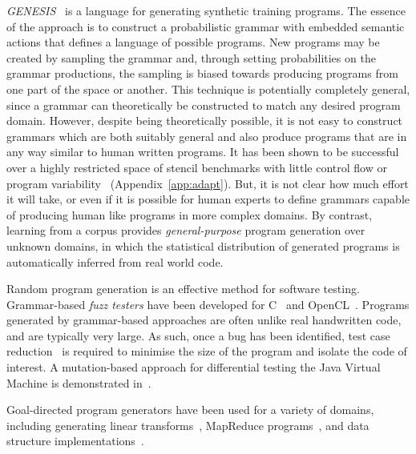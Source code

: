\emph{GENESIS}~\cite{Chiu2015} is a language for generating synthetic training programs. The essence of the approach is to construct a probabilistic grammar with embedded semantic actions that defines a language of possible programs. New programs may be created by sampling the grammar and, through setting probabilities on the grammar productions, the sampling is biased towards producing programs from one part of the space or another. This technique is potentially completely general, since a grammar can theoretically be constructed to match any desired program domain. However, despite being theoretically possible, it is not easy to construct grammars which are both suitably general and also produce programs that are in any way similar to human written programs. It has been shown to be successful over a highly restricted space of stencil benchmarks with little control flow or program variability~\cite{Garvey2015b,Falch2015} (Appendix~\ref{app:adapt}). But, it is not clear how much effort it will take, or even if it is possible for human experts to define grammars capable of producing human like programs in more complex domains. By contrast, learning from a corpus provides \emph{general-purpose} program generation over unknown domains, in which the statistical distribution of generated programs is automatically inferred from real world code.

Random program generation is an effective method for software testing. Grammar-based \emph{fuzz testers} have been developed for C~\cite{Yang2012} and OpenCL~\cite{Lidbury2015a}. Programs generated by grammar-based approaches are often unlike real handwritten code, and are typically very large. As such, once a bug has been identified, test case reduction~\cite{Regehr2012a} is required to minimise the size of the program and isolate the code of interest. A mutation-based approach for differential testing the Java Virtual Machine is demonstrated in~\cite{Chena}.

Goal-directed program generators have been used for a variety of domains, including generating linear transforms~\cite{Voronenko2009}, MapReduce programs~\cite{Smith}, and data structure implementations~\cite{Loncaric2016}.


